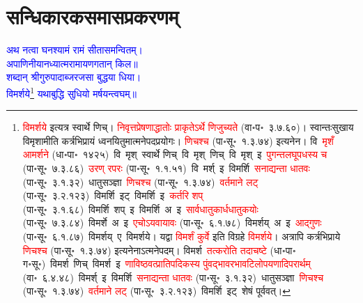 %
%
%

\renewcommand\chaptername{अथ प्रथमोऽध्यायः}
\chapter[\texorpdfstring{सन्धिकारकसमासप्रकरणम्‌}{प्रथमोऽध्यायः}]{सन्धिकारकसमासप्रकरणम्‌}
\vspace{-5mm}
\fontsize{16}{24}\selectfont\centering{}\textcolor{blue}{अथ नत्वा घनश्यामं रामं सीतासमन्वितम्।\nopagebreak\\
अपाणिनीयानध्यात्मरामायणगतान् किल॥\nopagebreak\\
शब्दान् श्रीगुरुपादाब्जरजसा बुद्धया धिया।\nopagebreak\\
विमर्शये\footnote{\textcolor{red}{विमर्शये} इत्यत्र स्वार्थे णिच्। \textcolor{red}{निवृत्त\-प्रेषणाद्धातोः प्राकृतेऽर्थे णिजुच्यते} (वा॰प॰~३.७.६०)। स्वान्तःसुखाय विमृशामीति कर्त्रभिप्रायं ध्वनयितुमात्मने\-पदप्रयोगः। \textcolor{red}{णिचश्च} (पा॰सू॰~१.३.७४) इत्यनेन। वि~\textcolor{red}{मृशँ आमर्शने} (धा॰पा॰~१४२५)~\arrow वि~मृश्~\arrow स्वार्थे णिच्~\arrow वि~मृश्~णिच्~\arrow वि~मृश्~इ~\arrow \textcolor{red}{पुगन्त\-लघूपधस्य च} (पा॰सू॰~७.३.८६)~\arrow \textcolor{red}{उरण् रपरः} (पा॰सू॰~१.१.५१)~\arrow वि~मर्श्~इ~\arrow विमर्शि~\arrow \textcolor{red}{सनाद्यन्ता धातवः} (पा॰सू॰~३.१.३२)~\arrow धातु\-सञ्ज्ञा~\arrow \textcolor{red}{णिचश्च} (पा॰सू॰~१.३.७४)~\arrow \textcolor{red}{वर्तमाने लट्} (पा॰सू॰~३.२.१२३)~\arrow विमर्शि~इट्~\arrow विमर्शि~इ~\arrow \textcolor{red}{कर्तरि शप्‌} (पा॰सू॰~३.१.६८)~\arrow विमर्शि~शप्~इ~\arrow विमर्शि~अ~इ~\arrow \textcolor{red}{सार्वधातुकार्ध\-धातुकयोः} (पा॰सू॰~७.३.८४)~\arrow विमर्शे~अ~इ~\arrow \textcolor{red}{एचोऽयवायावः} (पा॰सू॰~६.१.७८)~\arrow विमर्शय्~अ~इ~\arrow \textcolor{red}{आद्गुणः} (पा॰सू॰~६.१.८७)~\arrow विमर्शय्~ए~\arrow विमर्शये। यद्वा \textcolor{red}{विमर्शं कुर्वे} इति विग्रहे \textcolor{red}{विमर्शये}। अत्रापि कर्त्रभिप्राये \textcolor{red}{णिचश्च} (पा॰सू॰~१.३.७४) इत्यनेनाऽत्मने\-पदम्। विमर्श~\arrow \textcolor{red}{तत्करोति तदाचष्टे} (धा॰पा॰ ग॰सू॰)~\arrow विमर्श~णिच्~\arrow विमर्श~इ~\arrow \textcolor{red}{णाविष्ठवत्प्राति\-पदिकस्य पुंवद्भाव\-रभाव\-टिलोप\-यणादि\-परार्थम्} (वा॰~६.४.४८)~\arrow विमर्श्~इ~\arrow विमर्शि~\arrow \textcolor{red}{सनाद्यन्ता धातवः} (पा॰सू॰~३.१.३२)~\arrow धातु\-सञ्ज्ञा~\arrow \textcolor{red}{णिचश्च} (पा॰सू॰~१.३.७४)~\arrow \textcolor{red}{वर्तमाने लट्} (पा॰सू॰~३.२.१२३)~\arrow विमर्शि~इट्~\arrow शेषं पूर्ववत्।} यथाबुद्धि सुधियो मर्षयन्त्वघम्॥}\nopagebreak\\
